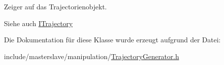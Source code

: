 Zeiger auf das Trajectorienobjekt. 

\begin{DoxySeeAlso}{Siehe auch}
\hyperlink{classITrajectory}{I\-Trajectory} 
\end{DoxySeeAlso}


Die Dokumentation für diese Klasse wurde erzeugt aufgrund der Datei\-:\begin{DoxyCompactItemize}
\item 
include/masterslave/manipulation/\hyperlink{TrajectoryGenerator_8h}{Trajectory\-Generator.\-h}\end{DoxyCompactItemize}
